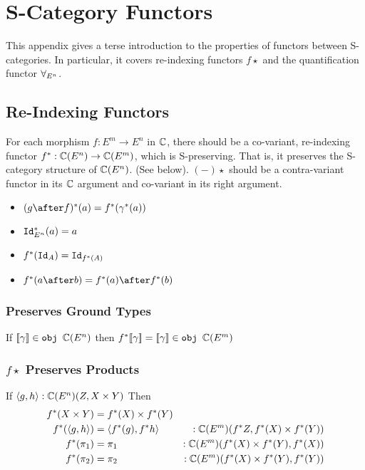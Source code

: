 


\chapter{S-Category Functors}

This appendix gives a terse introduction to the properties of functors between S-categories. In particular, it covers re-indexing functors $f\star$ and the quantification functor $\forall_{E^n}$.

\section{Re-Indexing Functors}\label{AppendixReindexingFunctors}
For each morphism $f: E^m \rightarrow E^n$ in $\mathbb{C}$, there should be a co-variant, re-indexing functor  $f^*: \mathbb{C}(E^n) \rightarrow \mathbb{C}(E^m)$, which is S-preserving. That is, it preserves the S-category structure of $\mathbb{C}(E^n)$. (See below). $(-)\star$ should be a contra-variant functor in its $\mathbb{C}$ argument and co-variant in its right argument.

\begin{itemize}
    \item $(g\after f)\star(a) = f\star(\g\star(a))$
    \item $\texttt{Id}_{E^n}^*(a) = a$
    \item $f^*(\texttt{Id}_{A}) = \texttt{Id}_{f^*(A)}$
    \item $f\star(a\after b) = f\star(a)\after f\star(b)$
\end{itemize}
\subsection{Preserves Ground Types}
If ${\bf [\![}\gamma{\bf ]\!]}\in\texttt{obj }\mathbb{C}(E^n)$ then $f^*{\bf [\![}\gamma{\bf ]\!]} = {\bf [\![}\gamma{\bf ]\!]}\in\texttt{obj }\mathbb{C}(E^m)$
\subsection{$f\star$ Preserves Products}
If $\langle g, h\rangle:\mathbb{C}(E^n)(Z, X\times Y)$
Then 
\begin{align*}
    f^*(X\times Y) & = f^*(X)\times f^*(Y)\\
    f^*(\langle g, h\rangle) & = \langle f^*(g), f^*{h}\rangle&:\mathbb{C}(E^m)(f^* Z, f^*(X)\times f^*(Y))\\
    f^*(\pi_1) & = \pi_1&:\mathbb{C}(E^m)(f^*(X)\times f^*(Y), f^*(X)) \\
    f^*(\pi_2) &= \pi_2&:\mathbb{C}(E^m)(f^*(X)\times f^*(Y), f^*(Y))
\end{align*}

